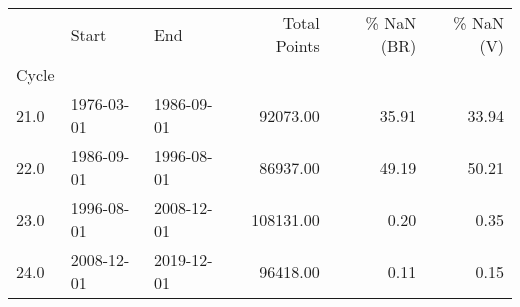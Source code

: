\begin{tabular}{lllrrr}
\toprule
{} &       Start &         End &  Total Points &  \% NaN (BR) &  \% NaN (V) \\
Cycle &             &             &               &             &            \\
\midrule
21.0  &  1976-03-01 &  1986-09-01 &      92073.00 &       35.91 &      33.94 \\
22.0  &  1986-09-01 &  1996-08-01 &      86937.00 &       49.19 &      50.21 \\
23.0  &  1996-08-01 &  2008-12-01 &     108131.00 &        0.20 &       0.35 \\
24.0  &  2008-12-01 &  2019-12-01 &      96418.00 &        0.11 &       0.15 \\
\bottomrule
\end{tabular}

